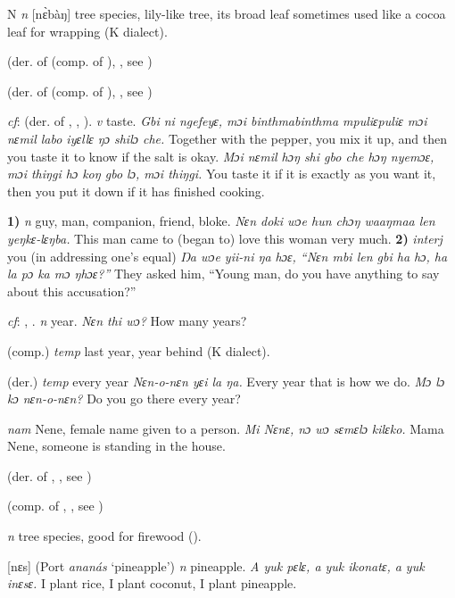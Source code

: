 \begin{letter}{N}
 \textit{n} [nɛ̀bàŋ] tree species, lily-like tree, its broad leaf sometimes used like a cocoa leaf for wrapping (K dialect). 

 (der. of  (comp. of ), , see ) 

 (der. of  (comp. of ), , see )

 \textit{cf}:  (der. of , , ). \textit{v} taste. \textit{Gbi ni ngefeyɛ, mɔi binthmabinthma mpuliɛpuliɛ mɔi nɛmil labo iyɛllɛ ŋɔ shilɔ che.} Together with the pepper, you mix it up, and then you taste it to know if the salt is okay. \textit{Mɔi nɛmil hɔŋ shi gbo che hɔŋ nyemɔɛ, mɔi thiŋgi hɔ koŋ gbo lɔ, mɔi thiŋgi.} You taste it if it is exactly as you want it, then you put it down if it has finished cooking.

 \textbf{1)} \textit{n} guy, man, companion, friend, bloke. \textit{Nɛn doki wɔe hun chɔŋ waaŋmaa len yeŋkɛ-lɛŋba.} This man came to (began to) love this woman very much. \textbf{2)} \textit{interj} you (in addressing one's equal) \textit{Ŋa wɔe yii-ni ŋa hɔɛ, “Nɛn mbi len gbi ha hɔ, ha la pɔ ka mɔ ŋhɔɛ?”} They asked him, “Young man, do you have anything to say about this accusation?”

 \textit{cf}: , . \textit{n} year. \textit{Nɛn thi wɔ?} How many years?

 (comp.) \textit{temp} last year, year behind (K dialect). 

 (der.) \textit{temp} every year \textit{Nɛn-o-nɛn yɛi la ŋa.} Every year that is how we do. \textit{Mɔ lɔ kɔ nɛn-o-nɛn?} Do you go there every year?

 \textit{nam} Nene, female name given to a person. \textit{Mi Nɛnɛ, nɔ wɔ sɛmɛlɔ kilɛko.} Mama Nene, someone is standing in the house.

 (der. of , , see ) 

 (comp. of , , see ) 

 \textit{n} tree species, good for firewood (\citealt{Pichl1967}).

 [nɛs] (Port \textit{ananás} ‘pineapple') \textit{n} pineapple. \textit{A yuk pɛlɛ, a yuk ikonatɛ, a yuk inɛsɛ.} I plant rice, I plant coconut, I plant pineapple.


\end{letter}
